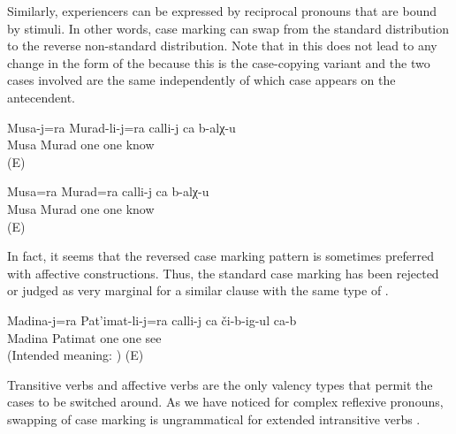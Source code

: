 Similarly, experiencers can be expressed by reciprocal pronouns that are bound by  stimuli. In other words, case marking can swap from the standard distribution to the reverse non-standard distribution. Note that in  this does not lead to any change in the form of the  because this is the case-copying variant and the two cases involved are the same independently of which case appears on the antecendent.

\begin{exe}
	\ex	\label{ex:Musa and Murad know each other}
	\begin{xlist}
		\ex	\label{ex:Musa and Murad know each other@A}
		\gll	Musa-j=ra	Murad-li-j=ra	calli-j	ca	b-alχ-u\\
			Musa	Murad	one	one	know\\
		\glt	{} (E)

		\ex	\label{ex:Musa and Murad know each other@B}
		\gll	Musa=ra	Murad=ra	calli-j	ca	b-alχ-u\\
			Musa\tsc{=add}	Murad	one	one	know\\
		\glt	{} (E)
	\end{xlist}
\end{exe}

In fact, it seems that the reversed case marking pattern is sometimes preferred with affective constructions. Thus, the standard case marking has been rejected or judged as very marginal for a similar clause with the same type of  .

\begin{exe}
	\ex	\label{ex:Madina and Patimat see each other uncertain@14}
		Madina-j=ra	Pat'imat-li-j=ra	calli-j	ca	či-b-ig-ul	ca-b\\
		{}	Madina	Patimat	one	one	see	\\
	\glt	(Intended meaning: ) (E)
\end{exe}

Transitive verbs and affective verbs are the only valency types that permit the cases to be switched around. As we have noticed for complex reflexive pronouns, swapping of case marking is ungrammatical for extended intransitive verbs .

